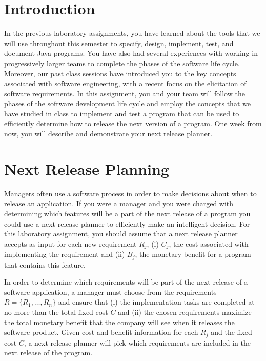 

\usepackage[compact]{titlesec}



\section*{Introduction}

In the previous laboratory assignments, you have learned about the tools that we will use throughout this semester to
specify, design, implement, test, and document Java programs.  You have also had several experiences with working in
progressively larger teams to complete the phases of the software life cycle.  Moreover, our past class sessions have
introduced you to the key concepts associated with software engineering, with a recent focus on the elicitation of
software requirements.  In this assignment, you and your team will follow the phases of the software development life
cycle and employ the concepts that we have studied in class to implement and test a program that can be used to
efficiently determine how to release the next version of a program. One week from now, you will describe and
demonstrate your next release planner.

\section*{Next Release Planning}

Managers often use a software process in order to make decisions about when to release an application.  If you were a
manager and you were charged with determining which features will be a part of the next release of a program you could
use a next release planner to efficiently make an intelligent decision.  For this laboratory assignment, you should
assume that a next release planner accepts as input for each new requirement $R_j$, (i) $C_j$, the cost associated with
implementing the requirement and (ii) $B_j$, the monetary benefit for a program that contains this feature.

In order to determine which requirements will be part of the next release of a software application, a manager must
choose from the requirements $R = \{ R_1, \ldots, R_n \}$ and ensure that (i) the implementation tasks are completed at
no more than the total fixed cost $C$ and (ii) the chosen requirements maximize the total monetary benefit that the
company will see when it releases the software product.  Given cost and benefit information for each $R_j$ and the fixed
cost $C$, a next release planner will pick which requirements are included in the next release of the program.

